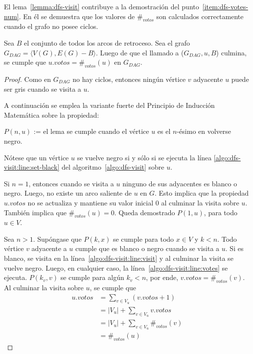 El lema~\ref{lemma:dfs-visit} contribuye a la demostraci\'on del punto~\ref{item:dfs-votes-num}. En \'el se demuestra que los valores de $\#_{votos}$ son calculados correctamente cuando el grafo no posee ciclos.

\begin{lemma}\label{lemma:dfs-visit}
    Sea $B$ el conjunto de todos los arcos de retroceso. Sea el grafo $G_{DAG} = \langle V(G), E(G) - B \rangle$.  Luego de que el llamado a \dfsvisitcaption($G_{DAG}, u, B$) culmina, se cumple que $u.votos = \#_{votos}(u)$ en $G_{DAG}$.
\end{lemma}

\begin{proof}
    Como en $G_{DAG}$ no hay ciclos, entonces ning\'un v\'ertice $v$ adyacente $u$ puede ser gris cuando se visita a $u$.

    A continuaci\'on se emplea la variante fuerte del Principio de Inducci\'on Matem\'atica sobre la propiedad:
    \begin{center}
        $P(n, u)$ := el lema se cumple cuando el v\'ertice $u$ es el $n$-\'esimo en volverse negro.
    \end{center}

    N\'otese que un v\'ertice $u$ se vuelve negro si y s\'olo si se ejecuta la l\'inea \ref{algo:dfs-visit:line:set-black} del algoritmo~\ref{algo:dfs-visit} sobre $u$.

    Si $n=1$, entonces cuando se visita a $u$ ninguno de sus adyacentes es blanco o negro. Luego, no existe un arco saliente de $u$ en $G$. Esto implica que la propiedad $u.votos$ no se actualiza y mantiene su valor inicial $0$ al culminar la visita sobre $u$. Tambi\'en implica que $\#_{votos}(u) = 0$. Queda demostrado $P(1, u)$, para todo $u \in V$.

    Sea $n>1$. Sup\'ongase que $P(k, x)$ se cumple para todo $x \in V$ y $k < n$. Todo v\'ertice $v$ adyacente a $u$ cumple que es blanco o negro cuando se visita a $u$. Si es blanco, se visita en la l\'inea~\ref{algo:dfs-visit:line:visit} y al culminar la visita se vuelve negro. Luego, en cualquier caso, la l\'inea~\ref{algo:dfs-visit:line:votes} se ejecuta. $P(k_v, v)$ se cumple para alg\'un $k_v < n$, por ende, $v.votos = \#_{votos}(v)$. Al culminar la visita sobre $u$, se cumple que
    \begin{align*}
        u.votos &= \sum_{v \in V_u} (v.votos + 1) \\
        &= |V_u| + \sum_{v \in V_u} v.votos \\
        &= |V_u| + \sum_{v \in V_u} \#_{votos}(v) \\
        &= \#_{votos}(u)
    \end{align*}
\end{proof}

